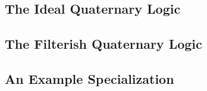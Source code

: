 \subsection{The Ideal Quaternary Logic}
\label{subsec:the_ideal_quaternary_semantics}


\subsection{The Filterish Quaternary Logic}
\label{subsec:the_filterish_quaternary_semantics}


\subsection{An Example Specialization}
\label{subsec:an_example_specialization}


